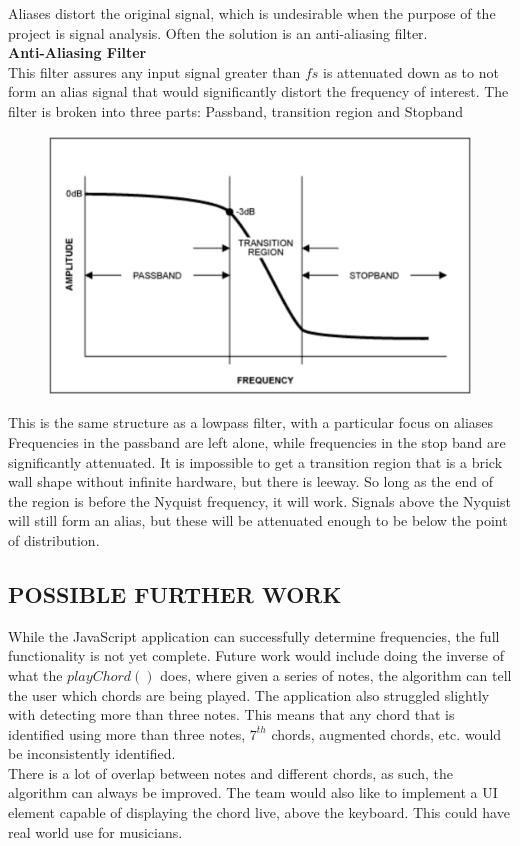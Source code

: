 \documentclass[12pt,a4paper]{article}
\begin{document}
Aliases distort the original signal, which is undesirable when the purpose of the project is signal analysis. Often the solution is an anti-aliasing filter.
\\\textbf{Anti-Aliasing Filter}\\
This filter assures any input signal greater than $fs$ is attenuated down as to not form an alias signal that would significantly distort the frequency of interest.
The filter is broken into three parts: Passband, transition region and Stopband
\begin{figure}[H]
	\begin{center}
		\includegraphics[width=0.7\linewidth]{Aliasing_Filter}
	\end{center}
\end{figure}
This is the same structure as a lowpass filter, with a particular focus on aliases
Frequencies in the passband are left alone, while frequencies in the stop band are significantly attenuated.
It is impossible to get a transition region that is a brick wall shape without infinite hardware, but there is leeway. So long as the end of the region is before the Nyquist frequency, it will work.
Signals above the Nyquist will still form an alias, but these will be attenuated enough to be below the point of distribution.

\newpage
\subsection{POSSIBLE FURTHER WORK}
While the JavaScript application can successfully determine frequencies, the full functionality is not yet
complete. Future work would include doing the inverse of what the $playChord()$ does, where given 
a series of notes, the algorithm can tell the user which chords are being played. The application also
struggled slightly with detecting more than three notes. This means that any chord that is identified
using more than three notes, $7^{th}$ chords, augmented chords, etc. would be inconsistently identified.\\
There is a lot of overlap between notes and different chords, as such, the algorithm can always be improved.
The team would also like to implement a UI element capable of displaying the chord live, above the keyboard.
This could have real world use for musicians.
\end{document}
